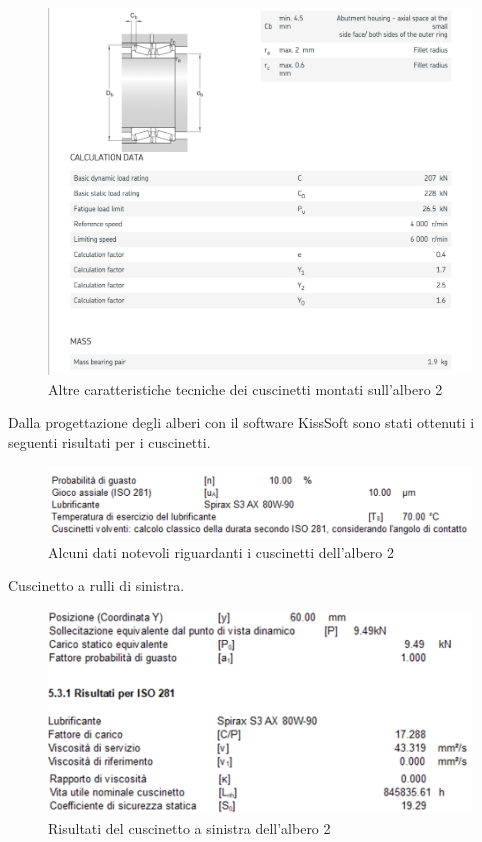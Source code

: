 \newpage
\begin{figure}[h]
    \centering
    \includegraphics[scale=0.6]{Immagini/Cuscinetti4Albero2.png}
    \caption{Altre caratteristiche tecniche dei cuscinetti montati sull'albero 2}
    \label{fig:Cuscinetti4Albero2}
\end{figure}

Dalla progettazione degli alberi con il software KissSoft sono stati ottenuti i seguenti risultati per i cuscinetti.
\begin{figure}[h]
    \centering
    \includegraphics[scale=0.6]{Immagini/DettagliCuscinettiAlbero2.png}
    \caption{Alcuni dati notevoli riguardanti i cuscinetti dell'albero 2}
    \label{fig:DettagliCuscinettiAlbero2}
\end{figure}
\newpage
Cuscinetto a rulli di sinistra.
\begin{figure}[h]
    \centering
        \includegraphics[scale=0.6]{Immagini/RisultatiCuscinettoSinistraAlbero2.png}
    \caption{Risultati del cuscinetto a sinistra dell'albero 2}
    \label{fig:RisultatiCuscinettoSinistraAlbero2}
\end{figure}

